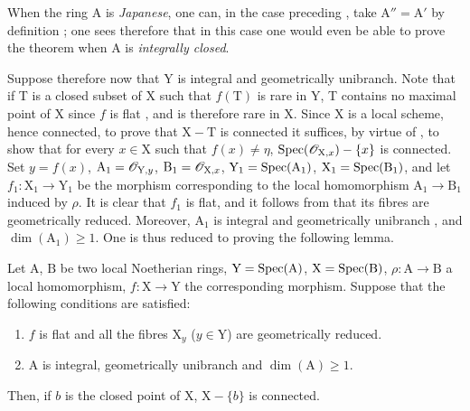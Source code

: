 \begin{remark}[18.9.7.1]
\label{IV.18.9.7.1}
When the ring A is \emph{Japanese}, one can, in the case preceding , take $\mathrm{A}''=\mathrm{A}'$ by definition ;
one sees therefore that in this case one would even be able to prove the theorem when A is \emph{integrally closed}.
\end{remark}

\begin{env}[18.9.7.2]
\label{IV.18.9.7.2}
Suppose therefore now that Y is integral and geometrically unibranch.
Note that if T is a closed subset of X such that $f(\mathrm{T})$ is rare in Y, T contains no maximal point of X since $f$ is flat , and is therefore rare in X.
Since X is a local scheme, hence connected, to prove that $\mathrm{X}-\mathrm{T}$ is connected it suffices, by virtue of , to show that for every $x\in\mathrm{X}$ such that $f(x)\neq\eta$, $\operatorname{Spec}(\mathscr{O}_{\mathrm{X},x})-\{x\}$ is connected.
Set $y=f(x)$, $\mathrm{A}_1=\mathscr{O}_{\mathrm{Y},y}$, $\mathrm{B}_1=\mathscr{O}_{\mathrm{X},x}$, $\mathrm{Y}_1=\operatorname{Spec}(\mathrm{A}_1)$, $\mathrm{X}_1=\operatorname{Spec}(\mathrm{B}_1)$, and let $f_1:\mathrm{X}_1\to\mathrm{Y}_1$ be the morphism corresponding to the local homomorphism $\mathrm{A}_1\to\mathrm{B}_1$ induced by $\rho$.
It is clear that $f_1$ is flat, and it follows from  that its fibres are geometrically reduced.
Moreover, $\mathrm{A}_1$ is integral and geometrically unibranch , and $\dim(\mathrm{A}_1)\geq 1$.
One is thus reduced to proving the following lemma.
\end{env}

\begin{lemma}[18.9.7.3]
\label{IV.18.9.7.3}
Let $\mathrm{A}$, $\mathrm{B}$ be two local Noetherian rings, $\mathrm{Y}=\operatorname{Spec}(\mathrm{A})$, $\mathrm{X}=\operatorname{Spec}(\mathrm{B})$, $\rho:\mathrm{A}\to\mathrm{B}$ a local homomorphism, $f:\mathrm{X}\to\mathrm{Y}$ the corresponding morphism.
Suppose that the following conditions are satisfied:
\begin{enumerate}[label=\emph{\roman*)}]
  \item $f$ is flat and all the fibres $\mathrm{X}_y$ ($y\in\mathrm{Y}$) are geometrically reduced.
  \item A is integral, geometrically unibranch and $\dim(\mathrm{A})\geq 1$.
\end{enumerate}
Then, if $b$ is the closed point of $\mathrm{X}$, $\mathrm{X}-\{b\}$ is connected.
\end{lemma}

